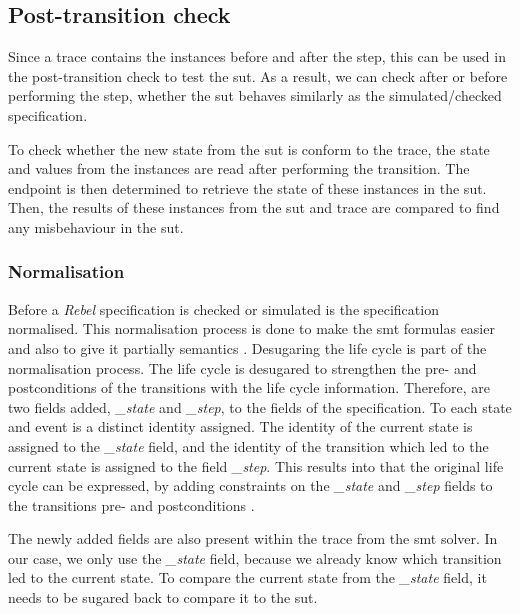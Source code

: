 \subsection{Post-transition check}

Since a trace contains the instances before and after the step, this can be used
in the post-transition check to test the \gls{sut}. As a result, we can check after or
before performing the step, whether the \gls{sut} behaves similarly as the
simulated/checked specification.

To check whether the new state from the \gls{sut} is
conform to the trace, the state and values from the instances are read after
performing the transition. The endpoint is then determined to retrieve the state
of these instances in the \gls{sut}. Then, the results of these instances from the \gls{sut}
and trace are compared to find any misbehaviour in the \gls{sut}.

\subsubsection{Normalisation}

Before a \textit{Rebel} specification is checked or simulated is the specification
normalised. This normalisation process is done to make the \gls{smt} formulas easier
and also to give it partially semantics
\cite[p.5]{stoel_storm_vinju_bosman_2016}. Desugaring the life cycle is part of
the normalisation process. The life cycle is desugared to strengthen the pre-
and postconditions of the transitions with the life cycle information.
Therefore, are two fields added, \textit{\_state} and \textit{\_step}, to the fields of the
specification. To each state and event is a distinct identity assigned. The
identity of the current state is assigned to the \textit{\_state} field, and the identity
of the transition which led to the current state is assigned to the field
\textit{\_step}. This results into that the original life cycle can be expressed, by
adding constraints on the \textit{\_state} and \textit{\_step} fields to the transitions pre- and
postconditions \cite[p.5]{stoel_storm_vinju_bosman_2016}.

The newly added fields
are also present within the trace from the \gls{smt} solver. In our case, we only use
the \textit{\_state} field, because we already know which transition led to the current
state. To compare the current state from the \textit{\_state} field, it needs to be
sugared back to compare it to the \gls{sut}.

